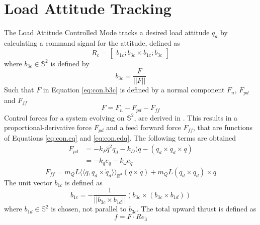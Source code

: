 \section{Load Attitude Tracking}\label{sec:con.loadatt}




The Load Attitude Controlled Mode tracks a desired load attitude $ q_d $ by calculating a command signal for the  attitude, defined as
\begin{equation}\label{eq:con.R}
R_c = \begin{bmatrix}
b_{1c}; b_{3c}\times b_{1c};b_{3c}
\end{bmatrix}
\end{equation}
where $ b_{3c} \in \mathbb{S}^2 $ is defined by 
\begin{equation}\label{eq:con.b3c}
b_{3c}=\frac{F}{||F||}
\end{equation}
Such that $ F $ in Equation \ref{eq:con.b3c} is defined by a normal component $ F_n $, $ F_{pd} $ and $ F_{ff}$
\begin{equation}\label{key}
F=F_n-F_{pd}-F_{ff}
\end{equation}
 Control forces for a system evolving on $ \mathbb{S}^2 $, are derived in \cite{Bullo2005}. 
 This results in a proportional-derivative force $ F_{pd} $ and a feed forward force $ F_{ff} $, that are functions of Equations \ref{eq:con.eq} and \ref{eq:con.edq}. The following terms are obtained
\begin{equation}\label{key}
\begin{aligned}
F_{pd}&=-k_P\hat{q}^2q_d-k_D(\dot{q}-(q_d\times\dot{q}_d\times q)\\
&=-k_qe_q-k_\omega e_{\dot{q}}
\end{aligned}
\end{equation}
\begin{equation}\label{key}
F_{ff}=m_QL\langle\langle q,q_d\times\dot{q}_d\rangle\rangle_{\mathbb{R}^3}(q\times \dot{q})+m_QL(q_d\times \ddot{q}_d)\times q
\end{equation}
The unit vector $ b_{1c} $ is defined as
\begin{equation}\label{key}
b_{1c}=-\frac{1}{||b_{3c}\times b_{1d}||}(b_{3c}\times(b_{3c}\times b_{1d}))
\end{equation}
where $ b_{1d}\in \mathbb{S}^2 $ is chosen, not parallel to $ b_{3c} $.
The total upward thrust is defined as
\begin{equation}\label{key}
f=F\cdot Re_3
\end{equation}

